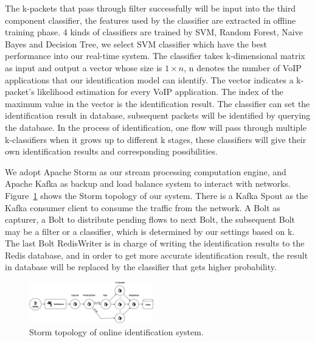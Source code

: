 \documentclass[conference]{IEEEtran}
\begin{document}
The k-packets that pass through filter successfully will be input into the third component classifier, the features used by the classifier are extracted in offline training phase. 4 kinds of classifiers are trained by SVM, Random Forest, Naive Bayes and Decision Tree, we select SVM classifier which have the best performance into our real-time system. The classifier takes k-dimensional matrix as input and output a vector whose size is $1 \times n$,  n denotes the number of VoIP applications that our identification model can identify. The vector indicates a k-packet's likelihood estimation for every VoIP application. The index of the maximum value in the vector is the identification result. The classifier can set the identification result in database, subsequent packets will be identified by querying the database. In the process of identification, one flow will pass through multiple k-classifiers when it grows up to different k stages, these classifiers will give their own identification results and corresponding possibilities. 

We adopt Apache Storm as our stream processing computation engine, and Apache Kafka as backup and load balance system to interact with networks. Figure~\ref{fig:storm} shows the Storm topology of our system. There is a Kafka Spout as the Kafka consumer client to consume the traffic from the network. A Bolt as capturer, a Bolt to distribute pending flows to next Bolt, the subsequent Bolt may be a filter or a classifier, which is determined by our settings based on k. The last Bolt RedisWriter is in charge of writing the identification results to the Redis database, and in order to get more accurate identification result, the result in database will be replaced by the classifier that gets higher probability.

\begin{figure}[htp]
\begin{center}
\includegraphics[width=0.48\textwidth]{storm.eps}
\caption{Storm topology of online identification system.}\label{fig:storm}
\end{center}
\end{figure}


\end{document}
